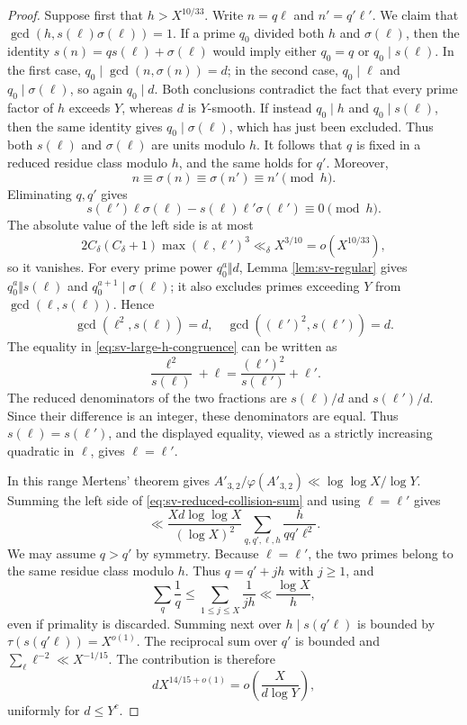 \documentclass[11pt,letterpaper,reqno]{amsart}
\numberwithin{equation}{section}
\theoremstyle{remark}
\renewcommand{\leq}{\leqslant}
\renewcommand{\geq}{\geqslant}
\begin{document}
\begin{proof}
Suppose first that $h>X^{10/33}$. Write $n=q\ell$ and $n'=q'\ell'$. We claim that
$\gcd(h,s(\ell)\sigma(\ell))=1$. If a prime $q_0$ divided both $h$
and $\sigma(\ell)$, then the identity
$s(n)=q s(\ell)+\sigma(\ell)$ would imply either $q_0=q$ or
$q_0\mid s(\ell)$. In the first case,
$q_0\mid\gcd(n,\sigma(n))=d$; in the second case,
$q_0\mid\ell$ and $q_0\mid\sigma(\ell)$, so again $q_0\mid d$.
Both conclusions contradict the fact that every prime factor of $h$ exceeds
$Y$, whereas $d$ is $Y$-smooth. If instead $q_0\mid h$ and
$q_0\mid s(\ell)$, then the same identity gives
$q_0\mid\sigma(\ell)$, which has just been excluded. Thus both
$s(\ell)$ and $\sigma(\ell)$ are units modulo $h$. It follows that
$q$ is fixed in a reduced residue class modulo $h$, and the same holds for
$q'$. Moreover,
\[
 n\equiv\sigma(n)\equiv\sigma(n')\equiv n'\pmod h.
\]
Eliminating $q,q'$ gives
\begin{equation}\label{eq:sv-large-h-congruence}
 s(\ell')\ell\sigma(\ell)-s(\ell)\ell'\sigma(\ell')
 \equiv0\pmod h.
\end{equation}
The absolute value of the left side is at most
\[
 2C_\delta(C_\delta+1)\max(\ell,\ell')^3
 \ll_\delta X^{3/10}=o(X^{10/33}),
\]
so it vanishes. For every prime power $q_0^a\Vert d$,
Lemma \ref{lem:sv-regular} gives
$q_0^a\Vert s(\ell)$ and $q_0^{a+1}\mid\sigma(\ell)$; it also excludes
primes exceeding $Y$ from $\gcd(\ell,s(\ell))$. Hence
\[
 \gcd(\ell^2,s(\ell))=d,
 \quad
 \gcd((\ell')^2,s(\ell'))=d.
\]
The equality in \eqref{eq:sv-large-h-congruence} can be written as
\[
 \frac{\ell^2}{s(\ell)}+\ell
 =\frac{(\ell')^2}{s(\ell')}+\ell'.
\]
The reduced denominators of the two fractions are $s(\ell)/d$ and
$s(\ell')/d$. Since their difference is an integer, these denominators
are equal. Thus $s(\ell)=s(\ell')$, and the displayed
equality, viewed as a strictly increasing quadratic in $\ell$, gives
$\ell=\ell'$.

In this range Mertens' theorem gives
$A'_{3,2}/\varphi(A'_{3,2})\ll\log\log X/\log Y$. Summing the left side of
\eqref{eq:sv-reduced-collision-sum} and using $\ell=\ell'$ gives
\[
 \ll\frac{Xd\log\log X}{(\log X)^2}
 \sum_{q,q',\ell,h}\frac{h}{qq'\ell^2}.
\]
We may assume $q>q'$ by symmetry. Because $\ell=\ell'$, the two primes
belong to the same residue class modulo $h$. Thus $q=q'+jh$ with $j\geq1$,
and
\[
 \sum_q\frac1q\leq\sum_{1\leq j\leq X}\frac1{jh}
 \ll\frac{\log X}{h},
\]
even if primality is discarded. Summing next
over $h\mid s(q'\ell)$ is bounded by
$\tau(s(q'\ell))=X^{o(1)}$. The reciprocal sum over $q'$ is bounded and
$\sum_\ell\ell^{-2}\ll X^{-1/15}$. The contribution is therefore
\[
 dX^{14/15+o(1)}=o\!\left(\frac{X}{d\log Y}\right),
\]
uniformly for $d\leq Y^c$.


\end{proof}
\end{document}
